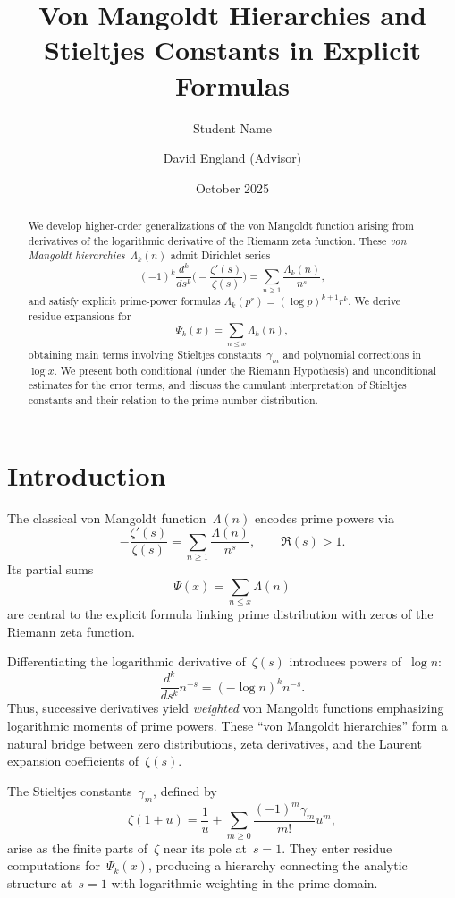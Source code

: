 \documentclass[12pt]{amsart}
\title[Von Mangoldt Hierarchies and Stieltjes Constants]{Von Mangoldt Hierarchies and Stieltjes Constants in Explicit Formulas}
\author{Student Name}
\author{David England (Advisor)}
\date{October 2025}
\begin{document}
\begin{abstract}
We develop higher-order generalizations of the von Mangoldt function arising from derivatives of the logarithmic derivative of the Riemann zeta function. These \emph{von Mangoldt hierarchies}~$\Lambda_k(n)$ admit Dirichlet series
\[
(-1)^k \frac{d^k}{ds^k}\!\Big(-\frac{\zeta'(s)}{\zeta(s)}\Big)
= \sum_{n\ge1} \frac{\Lambda_k(n)}{n^s},
\]
and satisfy explicit prime-power formulas $\Lambda_k(p^r)=(\log p)^{k+1}r^k$.
We derive residue expansions for
\[
\Psi_k(x)=\sum_{n\le x}\Lambda_k(n),
\]
obtaining main terms involving Stieltjes constants~$\gamma_m$ and polynomial corrections in~$\log x$.
We present both conditional (under the Riemann Hypothesis) and unconditional estimates for the error terms, and discuss the cumulant interpretation of Stieltjes constants and their relation to the prime number distribution.
\end{abstract}

\maketitle
\tableofcontents

\section{Introduction}

The classical von Mangoldt function~$\Lambda(n)$ encodes prime powers via
\[
-\frac{\zeta'(s)}{\zeta(s)}=\sum_{n\ge1}\frac{\Lambda(n)}{n^s},\qquad \Re(s)>1.
\]
Its partial sums
\[
\Psi(x)=\sum_{n\le x}\Lambda(n)
\]
are central to the explicit formula linking prime distribution with zeros of the Riemann zeta function.

Differentiating the logarithmic derivative of~$\zeta(s)$ introduces powers of~$\log n$:
\[
\frac{d^k}{ds^k} n^{-s}=(-\log n)^k n^{-s}.
\]
Thus, successive derivatives yield \emph{weighted} von Mangoldt functions emphasizing logarithmic moments of prime powers.
These ``von Mangoldt hierarchies'' form a natural bridge between zero distributions, zeta derivatives, and the Laurent expansion coefficients of~$\zeta(s)$.

The Stieltjes constants~$\gamma_m$, defined by
\[
\zeta(1+u)=\frac{1}{u}+\sum_{m\ge0}\frac{(-1)^m\gamma_m}{m!}u^m,
\]
arise as the finite parts of~$\zeta$ near its pole at~$s=1$. They enter residue computations for~$\Psi_k(x)$, producing a hierarchy connecting the analytic structure at~$s=1$ with logarithmic weighting in the prime domain.
\end{document}
